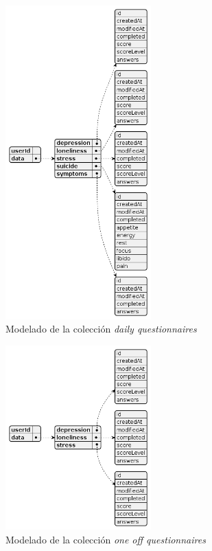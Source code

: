             \begin{figure}[h]
                \centering
                \includegraphics[width=0.5\textwidth]{figures/bd/Servidor daily questionnaires.png}
                \caption{Modelado de la colección \textit{daily questionnaires}}
                \label{figure:disenio:diagrama_daily}
            \end{figure}
            
            \begin{figure}[h]
                \centering
                \includegraphics[width=0.5\textwidth]{figures/bd/Servidor one off questionnaires.png}
                \caption{Modelado de la colección \textit{one off questionnaires}}
                \label{figure:disenio:diagrama_one_off}
            \end{figure}
            
